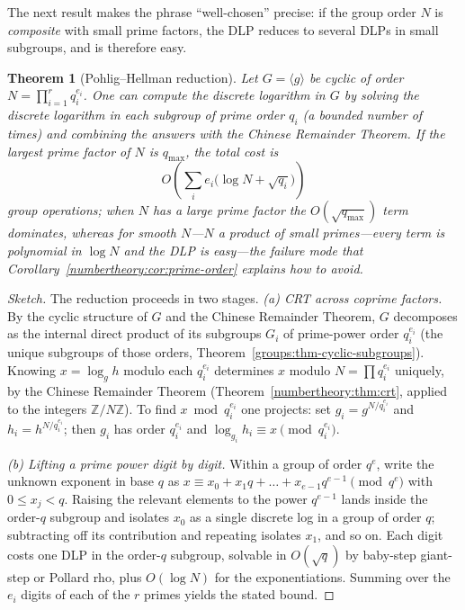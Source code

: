 \documentclass[11pt,a4paper]{article}
\newtheorem{theorem}{Theorem}[section]
\theoremstyle{definition}
\theoremstyle{remark}
\newcommand{\Z}{\ensuremath{\mathbb{Z}}}
\begin{document}
The next result makes the phrase ``well-chosen'' precise: if the group order \(N\) is \emph{composite} with small prime factors, the DLP reduces to several DLPs in small subgroups, and is therefore easy.

\begin{theorem}[Pohlig--Hellman reduction]\label{numbertheory:thm:pohlig-hellman}
Let \(G = \langle g\rangle\) be cyclic of order \(N = \prod_{i=1}^{r} q_i^{e_i}\). One can compute the discrete logarithm in \(G\) by solving the discrete logarithm in each subgroup of prime order \(q_i\) (a bounded number of times) and combining the answers with the Chinese Remainder Theorem. If the largest prime factor of \(N\) is \(q_{\max}\), the total cost is
\[
O\!\left(\sum_i e_i\bigl(\log N + \sqrt{q_i}\bigr)\right)
\]
group operations; when \(N\) has a large prime factor the \(O(\sqrt{q_{\max}})\) term dominates, whereas for \emph{smooth} \(N\)---\(N\) a product of small primes---every term is polynomial in \(\log N\) and the DLP is easy---the failure mode that Corollary~\ref{numbertheory:cor:prime-order} explains how to avoid.
\end{theorem}

\begin{proof}[Sketch]
The reduction proceeds in two stages. \emph{(a) CRT across coprime factors.} By the cyclic structure of \(G\) and the Chinese Remainder Theorem, \(G\) decomposes as the internal direct product of its subgroups \(G_i\) of prime-power order \(q_i^{e_i}\) (the unique subgroups of those orders, Theorem~\ref{groups:thm-cyclic-subgroups}). Knowing \(x = \log_g h\) modulo each \(q_i^{e_i}\) determines \(x\) modulo \(N = \prod q_i^{e_i}\) uniquely, by the Chinese Remainder Theorem (Theorem~\ref{numbertheory:thm:crt}, applied to the integers \(\Z/N\Z\)). To find \(x \bmod q_i^{e_i}\) one projects: set \(g_i = g^{N/q_i^{e_i}}\) and \(h_i = h^{N/q_i^{e_i}}\); then \(g_i\) has order \(q_i^{e_i}\) and \(\log_{g_i} h_i \equiv x \pmod{q_i^{e_i}}\).

\emph{(b) Lifting a prime power digit by digit.} Within a group of order \(q^{e}\), write the unknown exponent in base \(q\) as \(x \equiv x_0 + x_1 q + \dots + x_{e-1}q^{e-1} \pmod{q^e}\) with \(0 \le x_j < q\). Raising the relevant elements to the power \(q^{e-1}\) lands inside the order-\(q\) subgroup and isolates \(x_0\) as a single discrete log in a group of order \(q\); subtracting off its contribution and repeating isolates \(x_1\), and so on. Each digit costs one DLP in the order-\(q\) subgroup, solvable in \(O(\sqrt q)\) by baby-step giant-step or Pollard rho, plus \(O(\log N)\) for the exponentiations. Summing over the \(e_i\) digits of each of the \(r\) primes yields the stated bound.
\end{proof}
\end{document}
